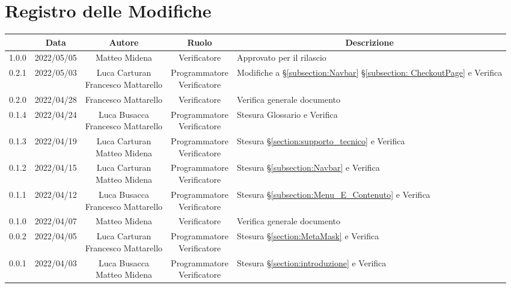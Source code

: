 \thispagestyle{empty}
\section*{Registro delle Modifiche}

\begin{center}
	\renewcommand{\arraystretch}{1.8}
	\begin{longtable}[c]{c | c | c | c | p{5cm}}
		\rowcolor[HTML]{125E28}
		\multicolumn{1}{c}{\color[HTML]{FFFFFF} \textbf{Versione}} & 
		\multicolumn{1}{c}{\color[HTML]{FFFFFF} \textbf{Data}} & 
		\multicolumn{1}{c}{\color[HTML]{FFFFFF} \textbf{Autore}} & 
		\multicolumn{1}{c}{\color[HTML]{FFFFFF} \textbf{Ruolo}} & 
		\multicolumn{1}{c}{\color[HTML]{FFFFFF} \textbf{Descrizione}} \\
		\endhead
		1.0.0 & 2022/05/05 & Matteo Midena & Verificatore & Approvato per il rilascio\\
		0.2.1 & 2022/05/03 & \Shortunderstack{Luca Carturan\\Francesco Mattarello} & \Shortunderstack{Programmatore\\Verificatore} & Modifiche a §\ref{subsection:Navbar} §\ref{subsection: CheckoutPage} e Verifica\\
		0.2.0 & 2022/04/28 & Francesco Mattarello & Verificatore & Verifica generale documento\\
		0.1.4 & 2022/04/24 & \Shortunderstack{Luca Busacca\\Francesco Mattarello} & \Shortunderstack{Programmatore\\Verificatore} & Stesura Glossario e Verifica\\
		0.1.3 & 2022/04/19 & \Shortunderstack{Luca Carturan\\Matteo Midena} & \Shortunderstack{Programmatore\\Verificatore} & Stesura §\ref{section:supporto_tecnico} e Verifica\\
		0.1.2 & 2022/04/15 & \Shortunderstack{Luca Carturan\\Matteo Midena} & \Shortunderstack{Programmatore\\Verificatore} & Stesura §\ref{subsection:Navbar} e Verifica\\
		0.1.1 & 2022/04/12 & \Shortunderstack{Luca Busacca\\Francesco Mattarello} & \Shortunderstack{Programmatore\\Verificatore} & Stesura §\ref{subsection:Menu_E_Contenuto} e Verifica\\
		0.1.0 & 2022/04/07 & Matteo Midena & Verificatore & Verifica generale documento\\
		0.0.2 & 2022/04/05 & \Shortunderstack{Luca Carturan\\Francesco Mattarello} & \Shortunderstack{Programmatore\\Verificatore} & Stesura §\ref{section:MetaMask} e Verifica\\
		0.0.1 & 2022/04/03 & \Shortunderstack{Luca Busacca\\Matteo Midena} & \Shortunderstack{Programmatore\\Verificatore} & Stesura §\ref{section:introduzione} e Verifica\\


\end{longtable}
\end{center}
